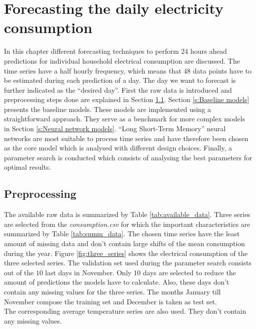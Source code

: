 \chapter{Forecasting the daily electricity consumption}
\label{cha:Forecasting the daily electricity consumption}
In this chapter different forecasting techniques to perform 24 hours ahead predictions for individual household electrical consumption are discussed. The time series have a half hourly frequency, which means that $ 48 $ data points have to be estimated during each prediction of a day. The day we want to forecast is further indicated as the ``desired day''. First the raw data is introduced and preprocessing steps done are explained in Section \ref{s:Preprocessing}. Section \ref{s:Baseline models} presents the baseline models. These models are implemented using a straightforward approach. They serve as a benchmark for more complex models in Section \ref{s:Neural network models}. ``Long Short-Term Memory'' neural networks are most suitable to process time series and have therefore been chosen as the core model which is analysed with different design choices. Finally, a parameter search is conducted which consists of analysing the best parameters for optimal results.
 
\section{Preprocessing}\label{s:Preprocessing}
The available raw data is summarized by Table \ref{tab:available_data}. 
Three series are selected from the \textit{consumption.csv} for which the important characteristics are summarized by Table \ref{tab:summ_data}. The chosen time series have the least amount of missing data and don't contain large shifts of the mean consumption during the year. Figure \ref{fig:three_series} shows the electrical consumption of the three selected series. The validation set used during the parameter search consists out of the $ 10 $ last days in November. Only $ 10 $ days are selected to reduce the amount of predictions the models have to calculate. Also, these days don't contain any missing values for the three series. The months January till  November compose the training set and December is taken as test set.\\ 
The corresponding average temperature series are also used. They don't contain any missing values.


